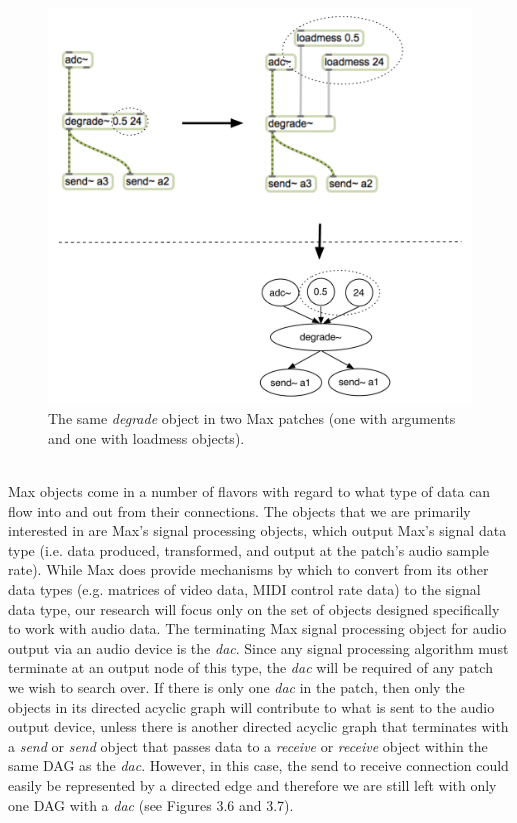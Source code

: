 \documentclass[a4paper,12pt]{report} 	%
\numberwithin{figure}{chapter}
\numberwithin{table}{chapter}
\numberwithin{equation}{chapter}
\begin{document}
\begin{flushleft}
\begin{figure}[h!]
\begin{center}
\includegraphics[scale=0.7]{MaxDAGsLoadmess}
\caption[Using loadmess Objects to Provide Parameters to Max]{The same \emph{degrade\texttildelow{}} object in two Max patches (one with arguments and one with loadmess objects).}
\end{center}
\end{figure}
\\
Max objects come in a number of flavors with regard to what type of data can flow into and out from their connections. The objects that we are primarily interested in are Max's signal processing objects, which output Max's signal data type (i.e. data produced, transformed, and output at the patch's audio sample rate). While Max does provide mechanisms by which to convert from its other data types (e.g. matrices of video data, MIDI control rate data) to the signal data type, our research will focus only on the set of objects designed specifically to work with audio data. The terminating Max signal processing object for audio output via an audio device is the \emph{dac\texttildelow{}}. Since any signal processing algorithm must terminate at an output node of this type, the \emph{dac\texttildelow{}} will be required of any patch we wish to search over. If there is only one \emph{dac\texttildelow{}} in the patch, then only the objects in its directed acyclic graph will contribute to what is sent to the audio output device, unless there is another directed acyclic graph that terminates with a \emph{send} or \emph{send\texttildelow{}} object that passes data to a \emph{receive} or \emph{receive\texttildelow{}} object within the same DAG as the \emph{dac\texttildelow{}}. However, in this case, the send to receive connection could easily be represented by a directed edge and therefore we are still left with only one DAG with a \emph{dac\texttildelow{}} (see Figures 3.6 and 3.7).

\end{flushleft}
\end{document}
